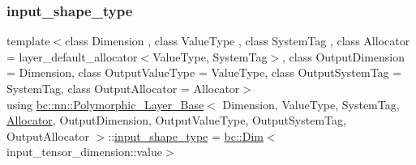 \mbox{\label{structbc_1_1nn_1_1Polymorphic__Layer__Base_ad69ba46ce14f9fbef88b834828052ab4}} 
\subsubsection{\texorpdfstring{input\+\_\+shape\+\_\+type}{input\_shape\_type}\hspace{0.1cm}{\footnotesize\ttfamily [2/2]}}
{\footnotesize\ttfamily template$<$class Dimension , class Value\+Type , class System\+Tag , class Allocator  = layer\+\_\+default\+\_\+allocator$<$\+Value\+Type, System\+Tag$>$, class Output\+Dimension  = Dimension, class Output\+Value\+Type  = Value\+Type, class Output\+System\+Tag  = System\+Tag, class Output\+Allocator  = Allocator$>$ \\
using \hyperlink{structbc_1_1nn_1_1Polymorphic__Layer__Base}{bc\+::nn\+::\+Polymorphic\+\_\+\+Layer\+\_\+\+Base}$<$ Dimension, Value\+Type, System\+Tag, \hyperlink{classbc_1_1allocators_1_1Allocator}{Allocator}, Output\+Dimension, Output\+Value\+Type, Output\+System\+Tag, Output\+Allocator $>$\+::\hyperlink{structbc_1_1nn_1_1Polymorphic__Layer__Base_ad69ba46ce14f9fbef88b834828052ab4}{input\+\_\+shape\+\_\+type} =  \hyperlink{structbc_1_1Dim}{bc\+::\+Dim}$<$input\+\_\+tensor\+\_\+dimension\+::value$>$}

\mbox{\label{structbc_1_1nn_1_1Polymorphic__Layer__Base_a9cf367e8f043b3bc7ac8ce8f5aeaa832}} 
